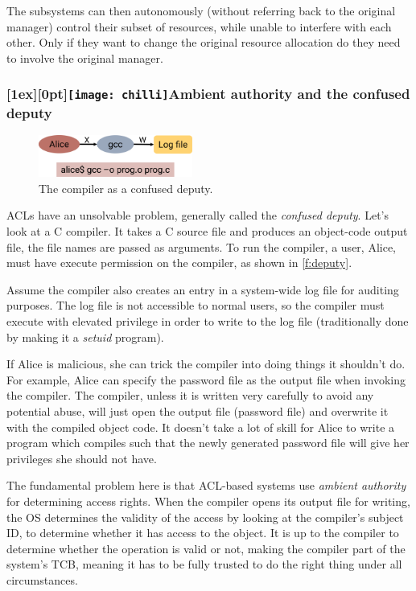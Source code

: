\documentclass[english,a4paper,12pt\ifDraft,draft\fi]{report}
\newcommand{\SSSect}[1]{\subsubsection*{#1}}
\newcommand{\SSSect}[1]{\subsection*{#1}}
\newcommand{\chilli}{\texttt{[image: chilli]}}
\newcommand{\chilliSect}{\raisebox{-2mm}[1ex][0pt]{\chilli\hspace{0.8em}}}
\begin{document}
  The subsystems can then autonomously (without referring back to the
  original manager) control their subset of resources, while unable
  to interfere with each other. Only if they want to change the original
  resource allocation do they need to involve the original manager.

  \SSSect{\chilliSect Ambient authority and the confused deputy}

  \begin{figure}[th]
    \centering
    \includegraphics[width=0.45\textwidth]{deputy}
    \caption{The compiler as a confused deputy.}
    \label{f:deputy}
  \end{figure}

  ACLs have an unsolvable problem, generally called the \emph{confused
  deputy}. Let's look at a C compiler. It takes a C source file and
  produces an object-code output file, the file names are passed as
  arguments. To run the compiler, a user, Alice, must have execute
  permission on the compiler, as shown in \autoref{f:deputy}.

  Assume the compiler also creates an entry in a system-wide log file
  for auditing purposes. The log file is not accessible to normal
  users, so the compiler must execute with elevated privilege in order
  to write to the log file (traditionally done by making it a
  \emph{setuid} program).

  If Alice is malicious, she can trick the compiler into doing things
  it shouldn't do. For example, Alice can specify the password file as
  the output file when invoking the compiler. The compiler, unless it
  is written very carefully to avoid any potential abuse, will just
  open the output file (password file) and overwrite it with the
  compiled object code. It doesn't take a lot of skill for Alice to
  write a program which compiles such that the newly generated
  password file will give her privileges she should not have.

  The fundamental problem here is that ACL-based systems use
  \emph{ambient authority} for determining access rights. When the
  compiler opens its output file for writing, the OS determines the
  validity of the access by looking at the compiler's subject ID, to
  determine whether it has access to the object. It is up to the
  compiler to determine whether the operation is valid or not, making
  the compiler part of the system's TCB, meaning it has to be fully
  trusted to do the right thing under all circumstances.
\end{document}
